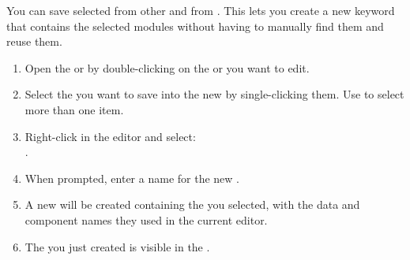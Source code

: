 
You can save selected \gdcases{} from other \gdcases{} and from \gdsuites{}. This lets you create a new keyword that contains the selected modules without having to manually find them and reuse them. 

\begin{enumerate}
\item Open the \gdtestcaseeditor{} or \gdtestsuiteeditor{} by double-clicking on the \gdcase{} or \gdsuite{} you  want to edit. 
\item Select the \gdcases{} you want to save into the new \gdcase{}  by single-clicking them. Use 
   to select more than one item. 
\item Right-click in the editor and  select: \\
.
\item When prompted, enter a name for the new \gdcase{}. 
\item A new \gdcase{} will be created containing the \gdcases{} you selected, with the data and component names they used in the current editor.  
\item The \gdcase{} you just created is visible in the \gdtestcasebrowser{}. 
\end{enumerate}
